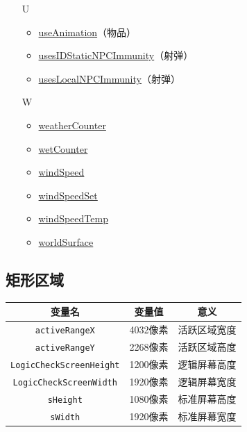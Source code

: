 \begin{multicols}{2}[]
{\begin{itemize}
\begin{itemize}
	\item \hyperref[tab4618]{safeRangeX}
	\item \hyperref[tab4618]{safeRangeY}
	\item \hyperref[tab9]{sHeight}
	\item \hyperref[tab4618]{spawnRangeX}
	\item \hyperref[tab4618]{spawnRangeY}
	\item \hyperref[tab10]{stuckAmount}
	\item \hyperref[tab10]{stuckCount}
	\item \hyperref[tab9]{sWidth}
	\end{itemize}
\item[U] \begin{itemize}
	\item \hyperref[sec28]{useAnimation}（物品）
	\item \hyperref[sec25]{usesIDStaticNPCImmunity}（射弹）
	\item \hyperref[sec25]{usesLocalNPCImmunity}（射弹）
	\end{itemize}
\item[W] \begin{itemize}
	\item \href{https://www.bbstr.net/threads/133/#post-623}{weatherCounter}
	\item \hyperref[tab10]{wetCounter}
	\item \href{https://www.bbstr.net/threads/133/#post-623}{windSpeed}
	\item \href{https://www.bbstr.net/threads/133/#post-623}{windSpeedSet}
	\item \href{https://www.bbstr.net/threads/133/#post-623}{windSpeedTemp}
	\item \hyperref[tab8]{worldSurface}
	\end{itemize}
\end{itemize}
}
\end{multicols}

\subsection{矩形区域}\label{tab9}
\begin{longtable}{|c|c|c|}
\hline 变量名&变量值&意义\\\hline
\endhead
\hline
\endfoot
{\lstinline!activeRangeX!}&4032像素&活跃区域宽度\\\hline
{\lstinline!activeRangeY!}&2268像素&活跃区域高度\\\hline
{\lstinline!LogicCheckScreenHeight!}&1200像素&逻辑屏幕高度\\\hline
{\lstinline!LogicCheckScreenWidth!}&1920像素&逻辑屏幕宽度\\\hline
{\lstinline!sHeight!}&1080像素&标准屏幕高度\\\hline
{\lstinline!sWidth!}&1920像素&标准屏幕宽度\\
\end{longtable}

